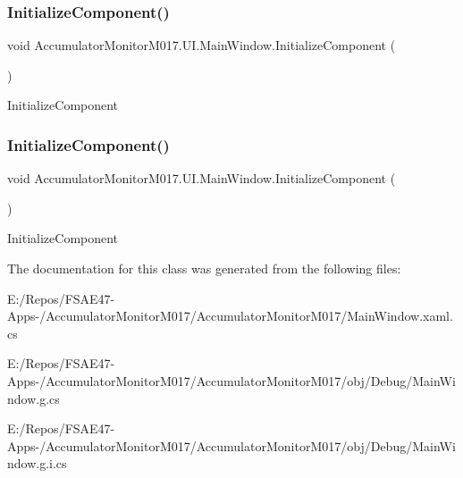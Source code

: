 \subsubsection{\texorpdfstring{Initialize\+Component()}{InitializeComponent()}\hspace{0.1cm}{\footnotesize\ttfamily [3/4]}}
{\footnotesize\ttfamily void Accumulator\+Monitor\+M017.\+U\+I.\+Main\+Window.\+Initialize\+Component (\begin{DoxyParamCaption}{ }\end{DoxyParamCaption})\hspace{0.3cm}{\ttfamily [inline]}}



Initialize\+Component 

\mbox{\label{class_accumulator_monitor_m017_1_1_u_i_1_1_main_window_ac226f7741a652d22dc88ede4fe477a7c}} 
\subsubsection{\texorpdfstring{Initialize\+Component()}{InitializeComponent()}\hspace{0.1cm}{\footnotesize\ttfamily [4/4]}}
{\footnotesize\ttfamily void Accumulator\+Monitor\+M017.\+U\+I.\+Main\+Window.\+Initialize\+Component (\begin{DoxyParamCaption}{ }\end{DoxyParamCaption})\hspace{0.3cm}{\ttfamily [inline]}}



Initialize\+Component 



The documentation for this class was generated from the following files\+:\begin{DoxyCompactItemize}
\item 
E\+:/\+Repos/\+F\+S\+A\+E47-\/\+Apps-\//\+Accumulator\+Monitor\+M017/\+Accumulator\+Monitor\+M017/Main\+Window.\+xaml.\+cs\item 
E\+:/\+Repos/\+F\+S\+A\+E47-\/\+Apps-\//\+Accumulator\+Monitor\+M017/\+Accumulator\+Monitor\+M017/obj/\+Debug/Main\+Window.\+g.\+cs\item 
E\+:/\+Repos/\+F\+S\+A\+E47-\/\+Apps-\//\+Accumulator\+Monitor\+M017/\+Accumulator\+Monitor\+M017/obj/\+Debug/Main\+Window.\+g.\+i.\+cs\end{DoxyCompactItemize}
